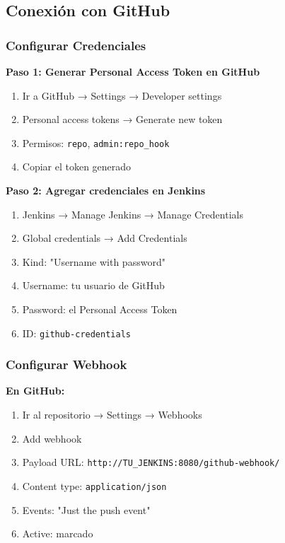 \documentclass[12pt,a4paper]{article}
\begin{document}
\subsection{Conexión con GitHub}

\subsubsection{Configurar Credenciales}

\textbf{Paso 1: Generar Personal Access Token en GitHub}
\begin{enumerate}
    \item Ir a GitHub → Settings → Developer settings
    \item Personal access tokens → Generate new token
    \item Permisos: \texttt{repo}, \texttt{admin:repo\_hook}
    \item Copiar el token generado
\end{enumerate}

\textbf{Paso 2: Agregar credenciales en Jenkins}
\begin{enumerate}
    \item Jenkins → Manage Jenkins → Manage Credentials
    \item Global credentials → Add Credentials
    \item Kind: "Username with password"
    \item Username: tu usuario de GitHub
    \item Password: el Personal Access Token
    \item ID: \texttt{github-credentials}
\end{enumerate}

\subsubsection{Configurar Webhook}

\textbf{En GitHub:}
\begin{enumerate}
    \item Ir al repositorio → Settings → Webhooks
    \item Add webhook
    \item Payload URL: \texttt{http://TU\_JENKINS:8080/github-webhook/}
    \item Content type: \texttt{application/json}
    \item Events: "Just the push event"
    \item Active: marcado
\end{enumerate}
\end{document}
